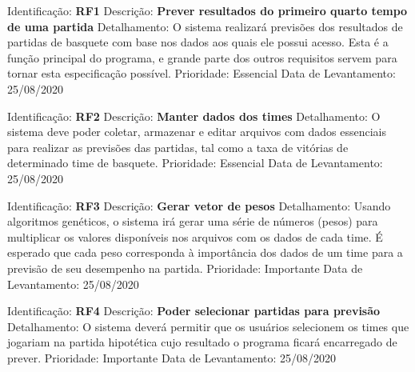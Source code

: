\documentclass[brazilian]{ifsc-tcc}
\begin{document}
Identificação: \textbf{RF1} \newline
Descrição: \textbf{Prever resultados do primeiro quarto tempo de uma partida} \newline
Detalhamento:  O sistema realizará previsões dos resultados de partidas de basquete com base nos dados aos quais ele possui acesso. Esta é a função principal do programa, e grande parte dos outros requisitos servem para tornar esta especificação possível.\newline
Prioridade: Essencial \newline
Data de Levantamento: 25/08/2020 \newline

Identificação: \textbf{RF2} \newline
Descrição: \textbf{Manter dados dos times} \newline 
Detalhamento: O sistema deve poder coletar, armazenar e editar arquivos com dados essenciais para realizar as previsões das partidas, tal como a taxa de vitórias de determinado time de basquete.\newline 
Prioridade: Essencial \newline 
Data de Levantamento: 25/08/2020 \newline

Identificação: \textbf{RF3} \newline
Descrição: \textbf{Gerar vetor de pesos} \newline 
Detalhamento: Usando algoritmos genéticos, o sistema irá gerar uma série de números (pesos) para multiplicar os valores disponíveis nos arquivos com os dados de cada time. É esperado que cada peso corresponda à importância dos dados de um time para a previsão de seu desempenho na partida.\newline 
Prioridade: Importante \newline
Data de Levantamento: 25/08/2020 \newline

Identificação: \textbf{RF4} \newline
Descrição: \textbf{Poder selecionar partidas para previsão} \newline 
Detalhamento: O sistema deverá permitir que os usuários selecionem os times que jogariam na partida hipotética cujo resultado o programa ficará encarregado de prever.\newline 
Prioridade: Importante \newline
Data de Levantamento: 25/08/2020 \newline
\end{document}
